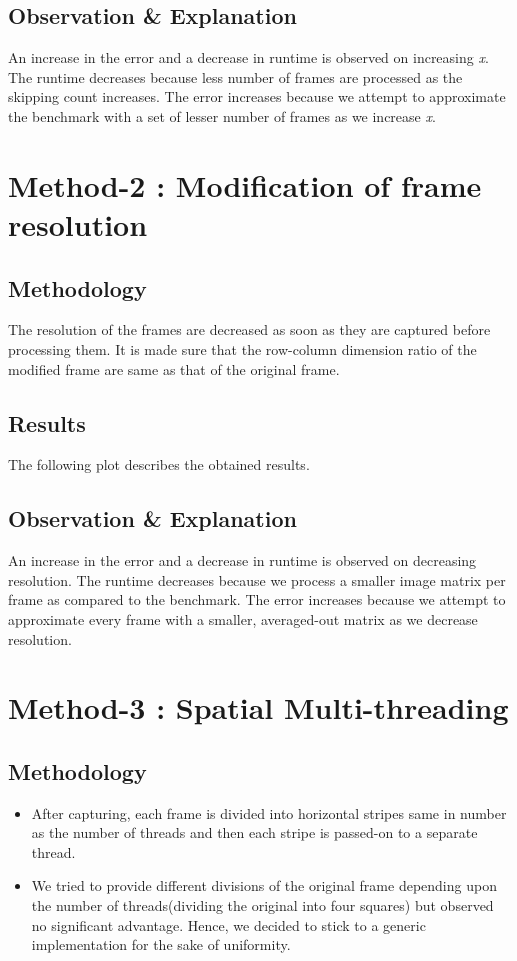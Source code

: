 \documentclass[a4paper]{article}
\begin{document}
\subsection*{Observation \& Explanation}
An increase in the error and a decrease in runtime is observed on increasing \textit{x}. The runtime decreases because less number of frames are processed as the skipping count increases. The error increases because we attempt to approximate the benchmark with a set of lesser number of frames as we increase \textit{x}.
\section*{Method-2 :  Modification of frame resolution }
\subsection*{Methodology}
The resolution of the frames are decreased as soon as they are captured before processing them. It is made sure that the row-column dimension ratio of the modified frame are same as that of the original frame.
\subsection*{Results}
The following plot describes the obtained results.
\subsection*{Observation \& Explanation}
An increase in the error and a decrease in runtime is observed on decreasing resolution. The runtime decreases because we process a smaller image matrix per frame as compared to the benchmark. The error increases because we attempt to approximate every frame with a smaller, averaged-out matrix as we decrease resolution.
\section*{Method-3 : Spatial Multi-threading}
\subsection*{Methodology}
\begin{itemize}
    \item After capturing, each frame is divided into horizontal stripes same in number as the number of threads and then each stripe is passed-on to a separate thread. 
    \item We tried to provide different divisions of the original frame depending upon the number of threads(dividing the original into four squares) but observed no significant advantage. Hence, we decided to stick to a generic implementation for the sake of uniformity.
\end{itemize}
\end{document}
